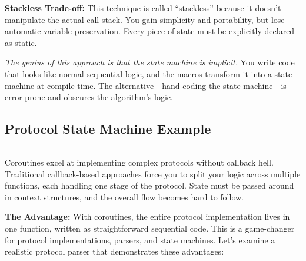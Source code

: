 \begin{warningbox}
\textbf{Stackless Trade-off:} This technique is called ``stackless'' because it doesn't manipulate the actual call stack. You gain simplicity and portability, but lose automatic variable preservation. Every piece of state must be explicitly declared as static.
\end{warningbox}

\vspace{0.2cm}
\noindent\textit{The genius of this approach is that the state machine is implicit.} You write code that looks like normal sequential logic, and the macros transform it into a state machine at compile time. The alternative---hand-coding the state machine---is error-prone and obscures the algorithm's logic.

\vspace{0.5cm}
\subsection{Protocol State Machine Example}

\noindent\rule{\textwidth}{0.4pt}
\vspace{0.2cm}

Coroutines excel at implementing complex protocols without callback hell. Traditional callback-based approaches force you to split your logic across multiple functions, each handling one stage of the protocol. State must be passed around in context structures, and the overall flow becomes hard to follow.

\textbf{The Advantage:} With coroutines, the entire protocol implementation lives in one function, written as straightforward sequential code. This is a game-changer for protocol implementations, parsers, and state machines. Let's examine a realistic protocol parser that demonstrates these advantages:

